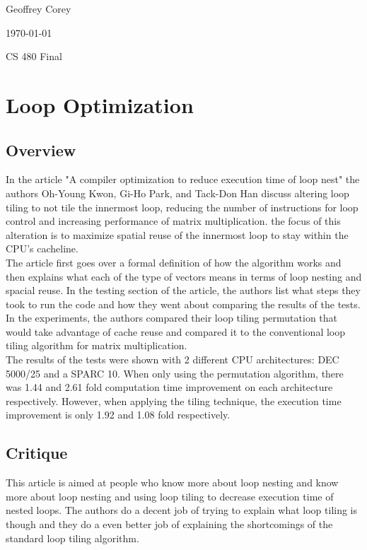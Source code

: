 \documentclass[letterpaper,10pt,titlepage]{article}
\def\name{Geoffrey Corey}
\begin{document}
\hfill \name

\hfill \today

\hfill CS 480 Final

\section*{Loop Optimization\cite{Kwon:1996:COR:232790.232792}}
\subsection*{Overview}
In the article "A compiler optimization to reduce execution time of loop nest" 
the authors Oh-Young Kwon, Gi-Ho Park, and Tack-Don Han discuss altering
loop tiling to not tile the innermost loop, reducing the number of 
instructions for loop control and increasing performance of matrix 
multiplication. the focus of this alteration is to maximize spatial reuse of 
the innermost loop to stay within the CPU's cacheline.\\

The article first goes over a formal definition of how the algorithm works and
then explains what each of the type of vectors means in terms of loop nesting
and spacial reuse. In the testing section of the article, the authors list
what steps they took to run the code and how they went about comparing the
results of the tests. In the experiments, the authors compared their loop
tiling permutation that would take advantage of cache reuse and compared it to
the conventional loop tiling algorithm for matrix multiplication.\\

The results of the tests were shown with 2 different CPU architectures:
DEC 5000/25 and a SPARC 10. When only using the permutation algorithm, there
was 1.44 and 2.61 fold computation time improvement on each architecture
respectively. However, when applying the tiling technique, the execution time
improvement is only 1.92 and 1.08 fold respectively.

\subsection*{Critique}
This article is aimed at people who know more about loop nesting and know more
about loop nesting and using loop tiling to decrease execution time of nested
loops. The authors do a decent job of trying to explain what loop tiling is
though and they do a even better job of explaining the shortcomings of the
standard loop tiling algorithm.\\
\end{document}
